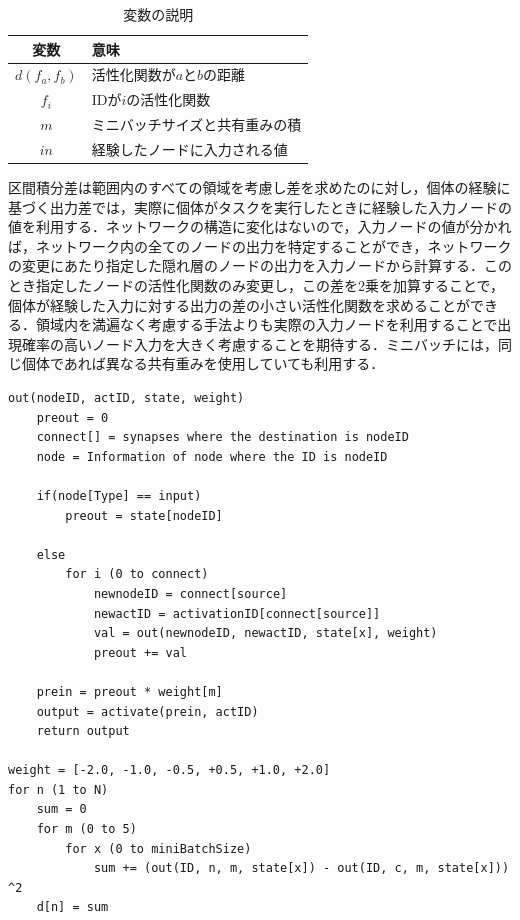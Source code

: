 \begin{table}[H]
    \caption{変数の説明}
    \centering
    \begin{tabular}{cl}
        \hline
        変数  & 意味 \\
        \hline \hline
        $d(f_{a}, f_{b})$ & 活性化関数が$a$と$b$の距離                 \\
        $f_{i}$           & IDが$i$の活性化関数                        \\
        $m$               & ミニバッチサイズと共有重みの積             \\
        $in$              & 経験したノードに入力される値               \\
        \hline
    \end{tabular}
\end{table}

区間積分差は範囲内のすべての領域を考慮し差を求めたのに対し，個体の経験に基づく出力差では，実際に個体がタスクを実行したときに経験した入力ノードの値を利用する．ネットワークの構造に変化はないので，入力ノードの値が分かれば，ネットワーク内の全てのノードの出力を特定することができ，ネットワークの変更にあたり指定した隠れ層のノードの出力を入力ノードから計算する．このとき指定したノードの活性化関数のみ変更し，この差を2乗を加算することで，個体が経験した入力に対する出力の差の小さい活性化関数を求めることができる．領域内を満遍なく考慮する手法よりも実際の入力ノードを利用することで出現確率の高いノード入力を大きく考慮することを期待する．ミニバッチには，同じ個体であれば異なる共有重みを使用していても利用する．

\begin{lstlisting}[caption=経験入力に基づく出力差のプログラム]
out(nodeID, actID, state, weight)
    preout = 0
    connect[] = synapses where the destination is nodeID
    node = Information of node where the ID is nodeID

    if(node[Type] == input)
        preout = state[nodeID]
    
    else
        for i (0 to connect)
            newnodeID = connect[source]
            newactID = activationID[connect[source]]
            val = out(newnodeID, newactID, state[x], weight)
            preout += val
    
    prein = preout * weight[m]
    output = activate(prein, actID)
    return output

weight = [-2.0, -1.0, -0.5, +0.5, +1.0, +2.0]
for n (1 to N)
    sum = 0
    for m (0 to 5)
        for x (0 to miniBatchSize)
            sum += (out(ID, n, m, state[x]) - out(ID, c, m, state[x])) ^2
    d[n] = sum
\end{lstlisting}

